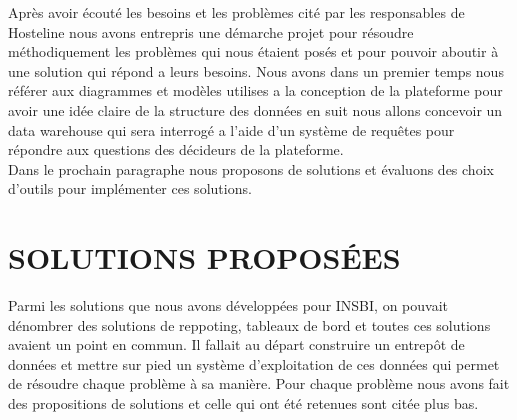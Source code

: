 Après avoir écouté les besoins et les problèmes cité par les responsables de Hosteline nous avons entrepris une démarche projet pour résoudre méthodiquement les problèmes qui nous étaient posés et pour pouvoir aboutir à une solution qui répond a leurs besoins. Nous avons dans un premier temps nous référer aux diagrammes et modèles utilises a la conception de la plateforme pour avoir une idée claire de la structure des données en suit nous allons concevoir un data warehouse qui sera interrogé a l’aide d’un système de requêtes pour répondre aux questions des décideurs de la plateforme.\\

Dans le prochain paragraphe nous proposons de solutions et évaluons des choix d’outils pour implémenter ces solutions.

\cleardoublepage
\section{SOLUTIONS PROPOSÉES}

Parmi les solutions que nous avons développées pour INSBI, on pouvait dénombrer des solutions de reppoting, tableaux de bord et toutes ces solutions avaient un point en commun. Il fallait au départ construire un entrepôt de données et mettre sur pied un système d’exploitation de ces données qui permet de résoudre chaque problème à sa manière. Pour chaque problème nous avons fait des propositions de solutions et celle qui ont été retenues sont citée plus bas.

